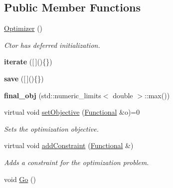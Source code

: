 \subsection*{Public Member Functions}
\begin{DoxyCompactItemize}
\item 
\hypertarget{classop_1_1Optimizer_a49e7cc7189b76c4e87bed1431f76971b}{\hyperlink{classop_1_1Optimizer_a49e7cc7189b76c4e87bed1431f76971b}{Optimizer} ()}\label{classop_1_1Optimizer_a49e7cc7189b76c4e87bed1431f76971b}

\begin{DoxyCompactList}\small\item\em Ctor has deferred initialization. \end{DoxyCompactList}\item 
\hypertarget{classop_1_1Optimizer_adbb150d1945b1dd1826be17db7bf04a4}{{\bfseries iterate} (\mbox{[}$\,$\mbox{]}()\{\})}\label{classop_1_1Optimizer_adbb150d1945b1dd1826be17db7bf04a4}

\item 
\hypertarget{classop_1_1Optimizer_afe5f788cd6b7d4fbe841259d288de856}{{\bfseries save} (\mbox{[}$\,$\mbox{]}()\{\})}\label{classop_1_1Optimizer_afe5f788cd6b7d4fbe841259d288de856}

\item 
\hypertarget{classop_1_1Optimizer_a8221b2206aaf7cfea9edecb8bcf80acc}{{\bfseries final\-\_\-obj} (std\-::numeric\-\_\-limits$<$ double $>$\-::max())}\label{classop_1_1Optimizer_a8221b2206aaf7cfea9edecb8bcf80acc}

\item 
virtual void \hyperlink{classop_1_1Optimizer_aace5e17d5ee0c38cd6f411d21dc2c3b0}{set\-Objective} (\hyperlink{classop_1_1Functional}{Functional} \&o)=0
\begin{DoxyCompactList}\small\item\em Sets the optimization objective. \end{DoxyCompactList}\item 
virtual void \hyperlink{classop_1_1Optimizer_ae5a8f5522cb39299687127115a904854}{add\-Constraint} (\hyperlink{classop_1_1Functional}{Functional} \&)
\begin{DoxyCompactList}\small\item\em Adds a constraint for the optimization problem. \end{DoxyCompactList}\item 
\hypertarget{classop_1_1Optimizer_a85dc4b913a2a68be6b163ca65397798f}{void \hyperlink{classop_1_1Optimizer_a85dc4b913a2a68be6b163ca65397798f}{Go} ()}\label{classop_1_1Optimizer_a85dc4b913a2a68be6b163ca65397798f}


\end{DoxyCompactItemize}
